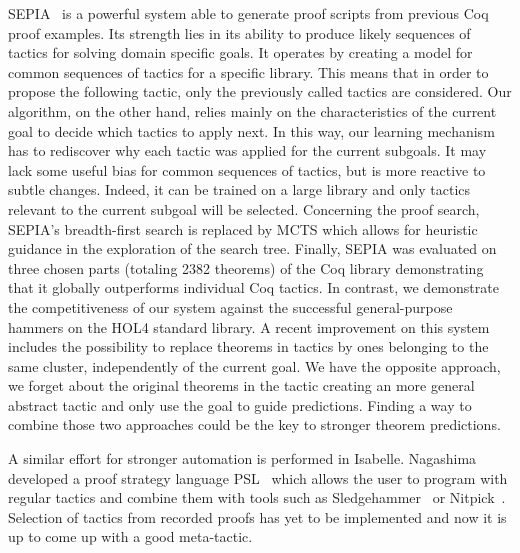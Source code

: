 \documentclass[runningheads,a4paper,draft]{svjour3}
\def\holfour{\textsf{HOL4}\xspace}
\def\isabelle{\textsf{Isabelle}\xspace}
\def\coq{\textsf{Coq}\xspace}
\def\sml{\textsf{SML}\xspace}
\def\holyhammer{\textsf{HOL(y)Hammer}\xspace}
\def\sledgehammer{\textsf{Sledgehammer}\xspace}
\def\tactictoe{\textsf{TacticToe}\xspace}
\begin{document}
\textsf{SEPIA}~\cite{DBLP:conf/cade/GransdenWR15} is a powerful system able to 
generate
proof scripts from previous \coq proof examples.
Its strength lies in its ability to produce likely sequences 
of tactics for solving domain specific goals. It operates by creating a model 
for common sequences of tactics for a specific library.
This means that in order to propose the following tactic, only the previously 
called tactics
are considered.
Our algorithm, on the other hand, relies mainly on the characteristics of the 
current goal 
to decide
which tactics to apply next. In this way, our learning mechanism has to 
rediscover why each 
tactic was applied for the current subgoals. It may lack some useful bias for 
common sequences 
of tactics, but is more reactive to subtle changes. Indeed, it can be trained 
on a large library and only tactics relevant to the current subgoal will be 
selected. 
Concerning the proof search, \textsf{SEPIA}'s %
breadth-first search is replaced by MCTS which allows for heuristic 
guidance in 
the exploration of the search tree.
Finally, \textsf{SEPIA} was evaluated on three chosen parts (totaling 2382 
theorems) of the 
\coq library demonstrating that it globally outperforms individual \coq 
tactics. In contrast, we demonstrate the competitiveness of our system against 
the successful general-purpose hammers on the \holfour standard library.
A recent improvement on this system~\cite{} includes the possibility to replace 
theorems in tactics by ones belonging to the same cluster, independently of the 
current goal. We have the opposite approach, we forget about the original 
theorems in the tactic creating an more general abstract tactic
and only use the goal to guide predictions. Finding a way to combine those two 
approaches could be the key to stronger theorem predictions.

A similar effort for stronger automation is performed in \isabelle. Nagashima 
developed a proof strategy language PSL~\cite{NagashimaK17psl} which allows the user to 
program with regular tactics and combine them with tools such as 
\sledgehammer~\cite{sledgehammer10} or Nitpick~\cite{Nitpick10}. 
Selection of tactics from recorded proofs has yet to be implemented and now it 
is up to come up with a good meta-tactic.

\end{document}
